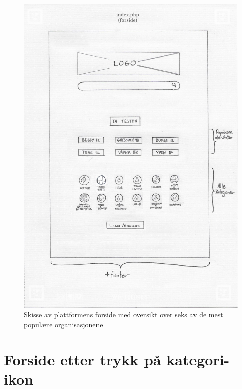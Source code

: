 \begin{figure}[H]
\centering
\includegraphics[width=.9\textwidth]{Illustrasjoner/Skisser-pdf/1.0/1-2-forside-mest-populaere.pdf}
\caption{Skisse av plattformens forside med oversikt over seks av de mest populære organisasjonene}
\label{vedlegg:1-2-forside-mest-pop}
\end{figure}

\section{Forside etter trykk på kategori-ikon}

